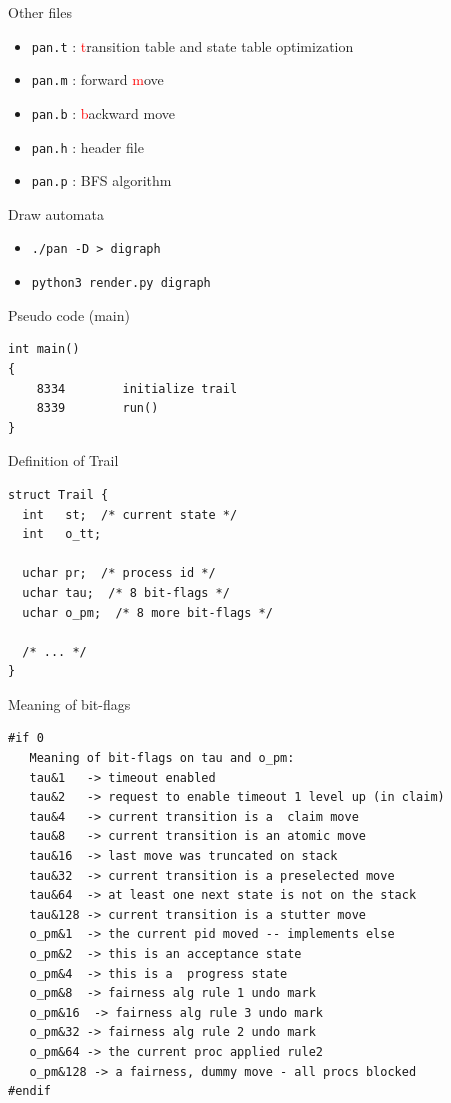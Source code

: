 \documentclass[12pt]{beamer}
\newcommand{\code}[1]{\texttt{#1}}
\begin{document}
\begin{frame}{Other files}
    \begin{itemize}
        \item \code{pan.t} : \textcolor{red}{t}ransition table and state table optimization
        \item \code{pan.m} : forward \textcolor{red}{m}ove
        \item \code{pan.b} : \textcolor{red}{b}ackward move
        \item \code{pan.h} : header file
        \item \code{pan.p} : BFS algorithm
    \end{itemize}
\end{frame}

\begin{frame}{Draw automata}
    \begin{itemize}
        \item \code{./pan -D > digraph}
        \item \code{python3 render.py digraph}
    \end{itemize}
\end{frame}

\begin{frame}[fragile]{Pseudo code (main)}
\begin{lstlisting}[basicstyle=\normalsize]
int main()
{
    8334        initialize trail
    8339        run()
}
\end{lstlisting}
\end{frame}

\begin{frame}[fragile]{Definition of Trail}
\begin{lstlisting}[basicstyle=\normalsize]
struct Trail {
  int   st;  /* current state */
  int   o_tt;
  
  uchar pr;  /* process id */
  uchar tau;  /* 8 bit-flags */
  uchar o_pm;  /* 8 more bit-flags */
  
  /* ... */
}
\end{lstlisting}
\end{frame}

\begin{frame}[fragile]{Meaning of bit-flags}
\begin{lstlisting}[basicstyle=\footnotesize]
#if 0
   Meaning of bit-flags on tau and o_pm:
   tau&1   -> timeout enabled
   tau&2   -> request to enable timeout 1 level up (in claim)
   tau&4   -> current transition is a  claim move
   tau&8   -> current transition is an atomic move
   tau&16  -> last move was truncated on stack
   tau&32  -> current transition is a preselected move
   tau&64  -> at least one next state is not on the stack
   tau&128 -> current transition is a stutter move
   o_pm&1  -> the current pid moved -- implements else
   o_pm&2  -> this is an acceptance state
   o_pm&4  -> this is a  progress state
   o_pm&8  -> fairness alg rule 1 undo mark
   o_pm&16  -> fairness alg rule 3 undo mark
   o_pm&32 -> fairness alg rule 2 undo mark
   o_pm&64 -> the current proc applied rule2
   o_pm&128 -> a fairness, dummy move - all procs blocked
#endif
\end{lstlisting}
\end{frame}
\end{document}
